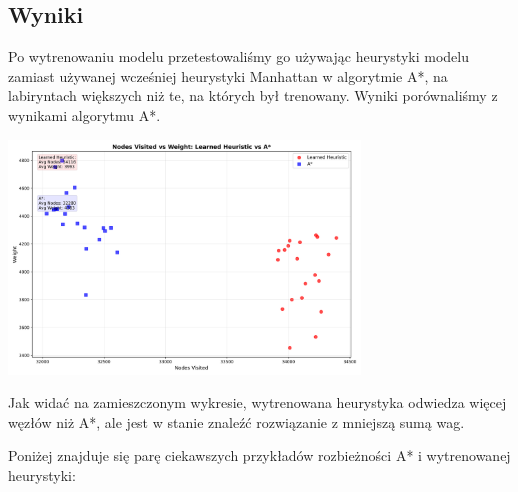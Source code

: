 \documentclass[a4paper,12pt]{article}
\begin{document}
  
  \subsection{Wyniki}

  Po wytrenowaniu modelu przetestowaliśmy go używając heurystyki modelu zamiast
  używanej wcześniej heurystyki Manhattan w algorytmie A*, na labiryntach
  większych niż te, na których był trenowany. Wyniki porównaliśmy z wynikami algorytmu A*.

  \begin{center}
    \includegraphics[width=0.7\textwidth]{../nodes_vs_weight_comparison.png}
  \end{center}

  Jak widać na zamieszczonym wykresie, wytrenowana heurystyka odwiedza więcej
  węzłów niż A*, ale jest w stanie znaleźć rozwiązanie z mniejszą sumą wag.

  Poniżej znajduje się parę ciekawszych przykładów rozbieżności A* i wytrenowanej heurystyki:
\end{document}

